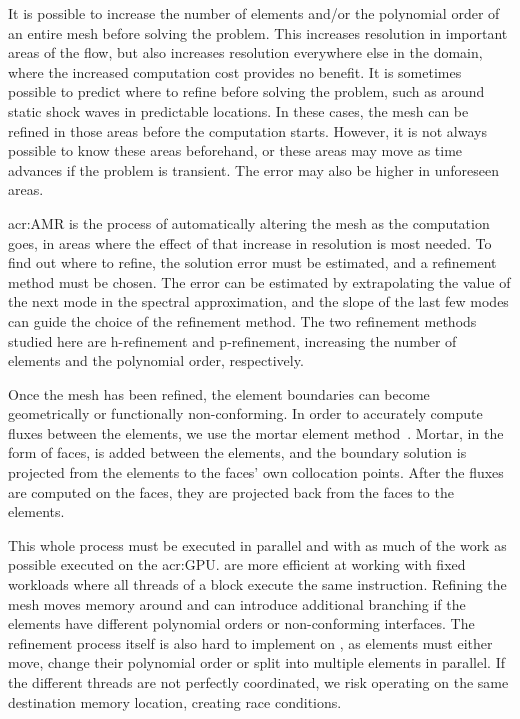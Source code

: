 It is possible to increase the number of elements and/or the polynomial order of an entire mesh
before solving the problem. This increases resolution in important areas of the flow, but also
increases resolution everywhere else in the domain, where the increased computation cost provides no
benefit. It is sometimes possible to predict where to refine before solving the problem, such as
around static shock waves in predictable locations. In these cases, the mesh can be refined in those
areas before the computation starts. However, it is not always possible to know these areas
beforehand, or these areas may move as time advances if the problem is transient. The error may also
be higher in unforeseen areas.

\Acrlong{acr:AMR} is the process of automatically altering the mesh as the computation goes, in
areas where the effect of that increase in resolution is most needed. To find out where to refine,
the solution error must be estimated, and a refinement method must be chosen. The error can be
estimated by extrapolating the value of the next mode in the spectral approximation, and the slope
of the last few modes can guide the choice of the refinement method. The two refinement methods
studied here are h-refinement and p-refinement, increasing the number of elements and the polynomial
order, respectively.

Once the mesh has been refined, the element boundaries can become geometrically or functionally
non-conforming. In order to accurately compute fluxes between the elements, we use the mortar element
method~\cite{Maday1989}. Mortar, in the form of faces, is added between the elements, and the
boundary solution is projected from the elements to the faces' own collocation points. After the
fluxes are computed on the faces, they are projected back from the faces to the elements. 

This whole process must be executed in parallel and with as much of the work as possible executed on
the \acrshort{acr:GPU}.  are more efficient at working with fixed workloads
where all threads of a block execute the same instruction. Refining the mesh moves memory around and
can introduce additional branching if the elements have different polynomial orders or
non-conforming interfaces. The refinement process itself is also hard to implement on
, as elements must either move, change their polynomial order or split into
multiple elements in parallel. If the different threads are not perfectly coordinated, we risk
operating on the same destination memory location, creating race conditions.

